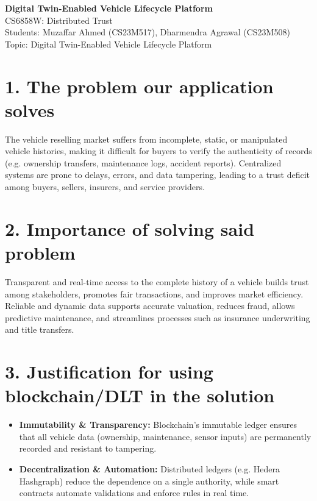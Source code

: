 \documentclass[12pt]{article}
\begin{document}

\begin{center}
    {\Large \textbf{Digital Twin-Enabled Vehicle Lifecycle Platform}}\\[0.5em]
    {\small CS6858W: Distributed Trust}\\[0.5em]
    {\small Students: Muzaffar Ahmed (CS23M517), Dharmendra Agrawal (CS23M508)}\\[0.5em]
    {\small Topic: Digital Twin-Enabled Vehicle Lifecycle Platform}
\end{center}

\section*{1. The problem our application solves}
The vehicle reselling market suffers from incomplete, static, or manipulated vehicle histories, making it difficult for buyers to verify the authenticity of records (e.g. ownership transfers, maintenance logs, accident reports). Centralized systems are prone to delays, errors, and data tampering, leading to a trust deficit among buyers, sellers, insurers, and service providers.

\section*{2. Importance of solving said problem}
Transparent and real-time access to the complete history of a vehicle builds trust among stakeholders, promotes fair transactions, and improves market efficiency. Reliable and dynamic data supports accurate valuation, reduces fraud, allows predictive maintenance, and streamlines processes such as insurance underwriting and title transfers.

\section*{3. Justification for using blockchain/DLT in the solution}
\begin{itemize}[leftmargin=*]
    \item \textbf{Immutability \& Transparency:} Blockchain’s immutable ledger ensures that all vehicle data (ownership, maintenance, sensor inputs) are permanently recorded and resistant to tampering.
    \item \textbf{Decentralization \& Automation:} Distributed ledgers (e.g. Hedera Hashgraph) reduce the dependence on a single authority, while smart contracts automate validations and enforce rules in real time.
\end{itemize}
\end{document}
